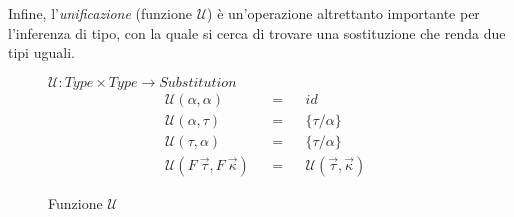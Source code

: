 \noindent Infine, l'\textit{unificazione} (funzione $\mathcal{U}$) è un'operazione altrettanto importante per l'inferenza di tipo,
con la quale si cerca di trovare una sostituzione che renda due tipi uguali.

\begin{figure}
    \vspace{4mm}
    $\mathcal{U} : Type \times Type \rightarrow Substitution$
    \newcommand{\funU}[2]{\mathcal{U}(#1, #2)}
    \newcommand{\funUline}[3]{& \funU{#1}{#2} & & = & & {#3}}
    \[
        \begin{aligned}
            \funUline{\alpha}{\alpha}{id}              \\
            \funUline{\alpha}{\tau}{\{\tau / \alpha\}} \\
            \funUline{\tau}{\alpha}{\{\tau / \alpha\}} \\
            \funUline{F\ \vec{\tau}}{F\ \vec{\kappa}}{\funU{\vec{\tau}}{\vec{\kappa}}}
        \end{aligned}
    \]
    \caption{Funzione $\mathcal{U}$}
    \label{fig:3-unification}
\end{figure}